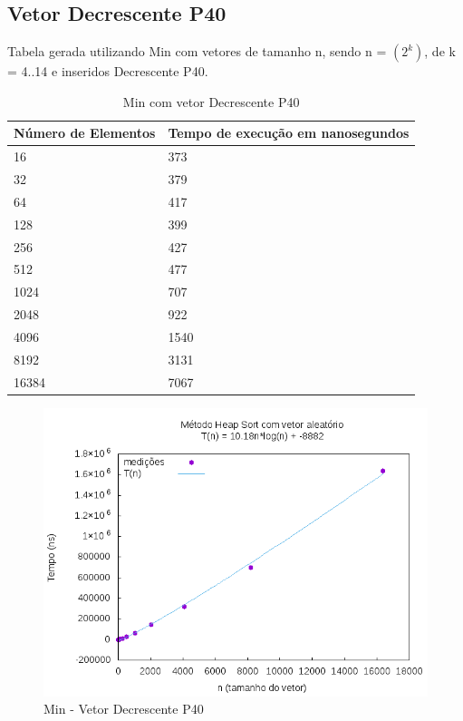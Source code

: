 \documentclass[12pt,a4paper,twoside]{report}
\begin{document}
\subsection{Vetor Decrescente P40}
Tabela gerada utilizando Min com vetores de tamanho n, sendo n = $(2^k)$, de k = 4..14 e inseridos Decrescente P40.
\begin{table}[H]
\centering
\caption{Min com vetor Decrescente P40}
\label{my-label}
\begin{tabular}{|l|l|}
\hline
\multicolumn{1}{|c|}{\textbf{Número de Elementos}} & \multicolumn{1}{c|}{\textbf{Tempo de execução em nanosegundos}} \\ \hline
16 & 373 \\ \hline
32 & 379 \\ \hline
64 & 417 \\ \hline
128 & 399 \\ \hline
256 & 427 \\ \hline
512 & 477 \\ \hline
1024 & 707 \\ \hline
2048 & 922 \\ \hline
4096 & 1540 \\ \hline
8192 & 3131 \\ \hline
16384 & 7067 \\ \hline
\end{tabular}
\end{table}

\begin{figure}[H]
    \centering
    \includegraphics[width=0.7\linewidth]{graficos/HeapSort/vIntAleatorio/vIntAleatorio.png}
  \caption{Min - Vetor Decrescente P40}
\end{figure}
\end{document}
